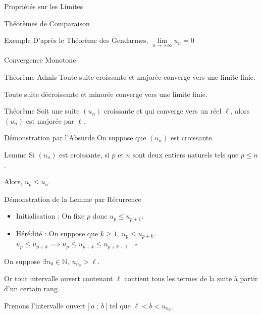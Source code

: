 \documentclass{coursbook}
\begin{document}
\begin{Gpartie}{Propriétés sur les Limites}
\begin{Spartie}{Théorèmes de Comparaison}
\begin{SSpartie}{Exemple}
                D'après le Théorème des Gendarmes, $\lim\limits_{n\to +\infty}u_n=0$
            \end{SSpartie}
        \end{Spartie}

        \begin{Spartie}{Convergence Monotone} 
            \begin{SSpartie}{Théorème Admis} 
                Toute suite croissante et majorée converge vers une limite finie.

                Toute suite décroissante et minorée converge vers une limite finie.
            \end{SSpartie}
            \begin{SSpartie}{Théorème} 
                Soit une suite $(u_n)$ croissante et qui converge vers un réel $\ell$, alors $(u_n)$ est majorée par $\ell$.
                \begin{SSSpartie}{Démonstration par l'Absurde} 
                    On suppose que $(u_n)$ est croissante.
                    \begin{SSSSpartie}{Lemme} 
                        Si $(u_n)$ est croissante, si $p$ et $n$ sont deux entiers naturels tels que $p\leq n$.

                        Alors, $u_p\leq u_n$.
                    \end{SSSSpartie}
                    \begin{SSSSpartie}{Démonstration de la Lemme par Récurrence}
                        \begin{itemize}
                            \item Initialisation : On fixe $p$ donc $u_p\leq u_{p+1}$.
                            \item Hérédité : On suppose que $k\geq 1,\ u_p\leq u_{p+k}$. \\
                            \phantom{Hérédité : }$u_p\leq u_{p+k}\implies u_p\leq u_{p+k}\leq u_{p+k+1}\quad\square$
                        \end{itemize}   
                    \end{SSSSpartie}
                    On suppose $\exists n_0\in\mathbb{N},\ u_{n_0}>\ell$.

                    Or tout intervalle ouvert contenant $\ell$ contient tous les termes de la suite à partir d'un certain rang.

                    Prenons l'intervalle ouvert $\big]\,a~;~b\,\big[$ tel que $\ell<b<u_{n_0}$.


\end{SSSpartie}
\end{SSpartie}
\end{Spartie}
\end{Gpartie}
\end{document}
